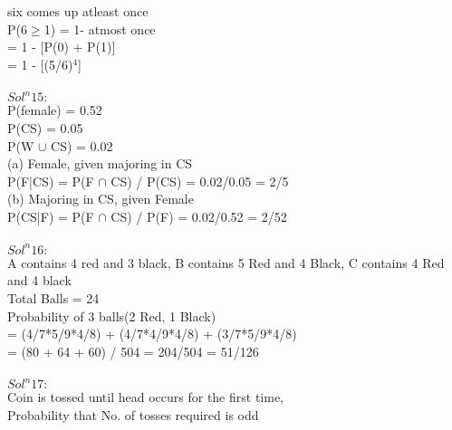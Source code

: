\documentclass{article}
\begin{document}
six comes up atleast once \\

P(6$\geq$1) = 1- atmost once \\

= 1 - [P(0) + P(1)] \\

= 1 - [(5/6)$^4$] \\
\\

\textbf{$Sol^n 15:$} \\

P(female) = 0.52 \\

P(CS) = 0.05 \\

P(W $\cup$ CS) = 0.02 \\

(a) Female, given majoring in CS \\

P(F|CS) = P(F $\cap$ CS) / P(CS) = 0.02/0.05 = 2/5 \\

(b) Majoring in CS, given Female \\

P(CS|F) = P(F $\cap$ CS) / P(F) = 0.02/0.52 = 2/52 \\ \\


\textbf{$Sol^n 16:$} \\

A contains 4 red and 3 black, B contains 5 Red and 4 Black, C contains 4 Red and 4 black \\

Total Balls = 24 \\

Probability of 3 balls(2 Red, 1 Black) \\

= (4/7*5/9*4/8) + (4/7*4/9*4/8) + (3/7*5/9*4/8) \\

= (80 + 64 + 60) / 504 = 204/504 = 51/126 \\
\\

\textbf{$Sol^n 17:$} \\

Coin is tossed until head occurs for the first time, \\

Probability that No. of tosses required is odd \\
\end{document}
